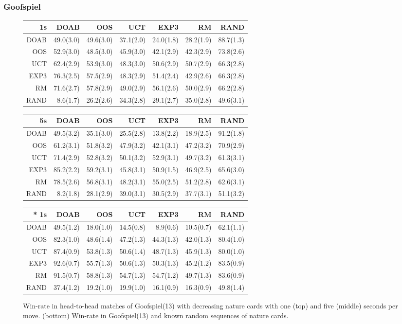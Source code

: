 \subsubsection{Goofspiel}
\begin{figure}
\centering
\begin{scriptsize}
\begin{tabular}{|r|rrrrrr|}\hline
1s&DOAB&OOS&UCT&EXP3&RM&RAND\\\hline
DOAB&49.0(3.0)&49.6(3.0)&37.1(2.0)&24.0(1.8)&28.2(1.9)&88.7(1.3)\\
OOS&52.9(3.0)&48.5(3.0)&45.9(3.0)&42.1(2.9)&42.3(2.9)&73.8(2.6)\\
UCT&62.4(2.9)&53.9(3.0)&48.3(3.0)&50.6(2.9)&50.7(2.9)&66.3(2.8)\\
EXP3&76.3(2.5)&57.5(2.9)&48.3(2.9)&51.4(2.4)&42.9(2.6)&66.3(2.8)\\
RM&71.6(2.7)&57.8(2.9)&49.0(2.9)&56.1(2.6)&50.0(2.9)&66.2(2.8)\\
RAND&8.6(1.7)&26.2(2.6)&34.3(2.8)&29.1(2.7)&35.0(2.8)&49.6(3.1)\\
\hline
\end{tabular}
\begin{tabular}{|r|rrrrrr|}\hline
5s&DOAB&OOS&UCT&EXP3&RM&RAND\\\hline
DOAB&49.5(3.2)&35.1(3.0)&25.5(2.8)&13.8(2.2)&18.9(2.5)&91.2(1.8)\\
OOS&61.2(3.1)&51.8(3.2)&47.9(3.2)&42.1(3.1)&47.2(3.2)&70.9(2.9)\\
UCT&71.4(2.9)&52.8(3.2)&50.1(3.2)&52.9(3.1)&49.7(3.2)&61.3(3.1)\\
EXP3&85.2(2.2)&59.2(3.1)&45.8(3.1)&50.9(1.5)&46.9(2.5)&65.6(3.0)\\
RM&78.5(2.6)&56.8(3.1)&48.2(3.1)&55.0(2.5)&51.2(2.8)&62.6(3.1)\\
RAND&8.2(1.8)&28.1(2.9)&39.0(3.1)&30.5(2.9)&37.7(3.1)&51.1(3.2)\\
\hline
\end{tabular}

\begin{tabular}{|r|rrrrrr|}\hline
* 1s&DOAB&OOS&UCT&EXP3&RM&RAND\\\hline
DOAB&49.5(1.2)&18.0(1.0)&14.5(0.8)&8.9(0.6)&10.5(0.7)&62.1(1.1)\\
OOS&82.3(1.0)&48.6(1.4)&47.2(1.3)&44.3(1.3)&42.0(1.3)&80.4(1.0)\\
UCT&87.4(0.9)&53.8(1.3)&50.6(1.4)&48.7(1.3)&45.9(1.3)&80.0(1.0)\\
EXP3&92.6(0.7)&55.7(1.3)&50.6(1.3)&50.3(1.3)&45.2(1.2)&83.5(0.9)\\
RM&91.5(0.7)&58.8(1.3)&54.7(1.3)&54.7(1.2)&49.7(1.3)&83.6(0.9)\\
RAND&37.4(1.2)&19.2(1.0)&19.9(1.0)&16.1(0.9)&16.3(0.9)&49.8(1.4)\\
\hline
\end{tabular}

\end{scriptsize}
\caption{Win-rate in head-to-head matches of Goofspiel(13) with decreasing nature cards with one (top) and five (middle) seconds per move. (bottom) Win-rate in Goofspiel(13) and known random sequences of nature cards.}\label{fig:matches:goof}
\end{figure}

